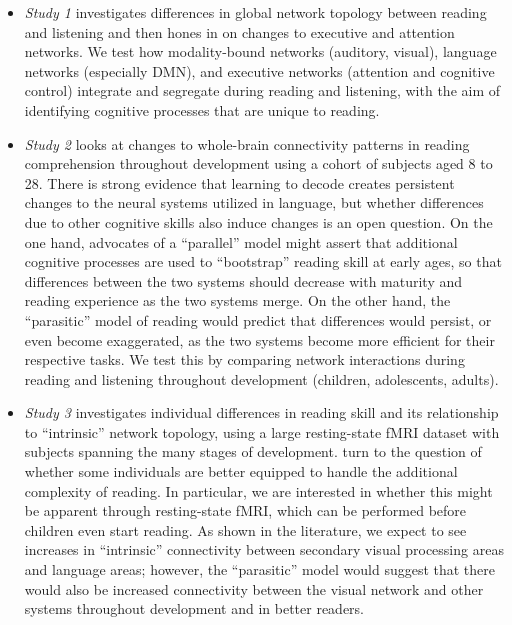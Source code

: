 \begin{itemize}

    \item \textit{Study 1} investigates differences in global network topology between reading and listening and then hones in on changes to executive and attention networks. We test how modality-bound networks (auditory, visual), language networks (especially DMN), and executive networks (attention and cognitive control) integrate and segregate during reading and listening, with the aim of identifying cognitive processes that are unique to reading.

    \item \textit{Study 2} looks at changes to whole-brain connectivity patterns in reading comprehension throughout development using a cohort of subjects aged 8 to 28. There is strong evidence that learning to decode creates persistent changes to the neural systems utilized in language, but whether differences due to other cognitive skills also induce changes is an open question. On the one hand, advocates of a ``parallel'' model might assert that additional cognitive processes are used to ``bootstrap'' reading skill at early ages, so that differences between the two systems should decrease with maturity and reading experience as the two systems merge. On the other hand, the ``parasitic'' model of reading would predict that differences would persist, or even become exaggerated, as the two systems become more efficient for their respective tasks. We test this by comparing network interactions during reading and listening throughout development (children, adolescents, adults).  

    \item \textit{Study 3} investigates individual differences in reading skill and its relationship to ``intrinsic'' network topology, using a large resting-state fMRI dataset with subjects spanning the many stages of development. turn to the question of whether some individuals are better equipped to handle the additional complexity of reading. In particular, we are interested in whether this  might be apparent through resting-state fMRI, which can be performed before children even start reading. As shown in the literature, we expect to see increases in ``intrinsic'' connectivity between secondary visual processing areas and language areas; however, the ``parasitic'' model would suggest that there would also be increased connectivity between the visual network and other systems throughout development and in better readers.

\end{itemize}

